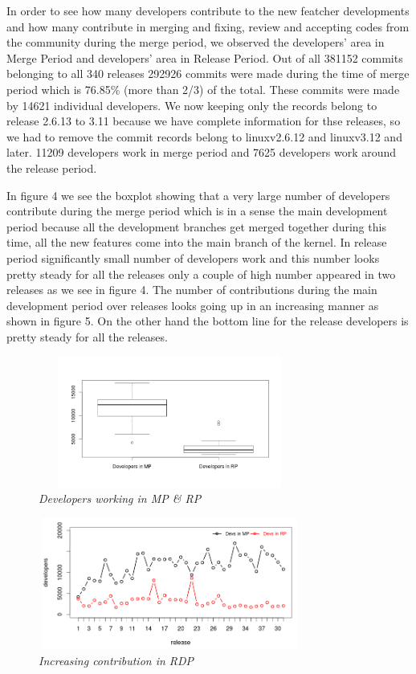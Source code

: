 \documentclass{acm_proc_article-sp}
\begin{document}
In order to see how many developers contribute to the new featcher developments and how many contribute in merging and fixing, review and accepting codes from the community during the merge period, we observed the developers' area in Merge Period and developers' area in Release Period. Out of all 381152 commits belonging to all 340 releases 292926 commits were made during the time of merge period which is 76.85\% (more than 2/3) of the total. These commits were made by 14621 individual developers. We now keeping only the records belong to release 2.6.13 to 3.11 because we have complete information for thse releases, so we had to remove the commit records belong to linuxv2.6.12 and linuxv3.12 and later. 11209 developers work in merge period and 7625 developers work around the release period.

In figure 4 we see the boxplot showing that a very large number of developers contribute during the merge period which is in a sense the main development period because all the development branches get merged together during this time, all the new features come into the main branch of the kernel. In release period significantly small number of developers work and this number looks pretty steady for all the releases only a couple of high number appeared in two releases as we see in figure 4. The number of contributions during the main development period over releases looks going up in an increasing manner as shown in figure 5. On the other hand the bottom line for the release developers is pretty steady for all the releases.

\begin{figure}
\begin{center}
\includegraphics[height=1.7in,width=3.4in]{devsMPRPbox.png}
\caption{\small \sl Developers working in MP \& RP}
\end{center}
\end{figure}

\begin{figure}
\begin{center}
\includegraphics[height=1.7in,width=3.4in]{devsMPRP.png}
\caption{\small \sl Increasing contribution in RDP}
\end{center}
\end{figure}
\end{document}
